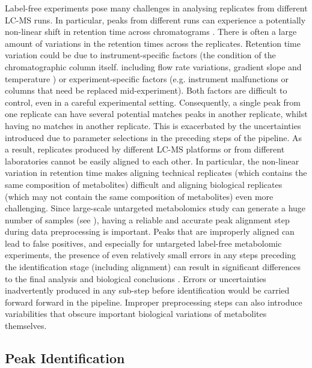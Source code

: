Label-free experiments pose many challenges in analysing replicates from different LC-MS runs. In particular, peaks from different runs can experience a potentially non-linear shift in retention time across chromatograms \cite{Podwojski2009}. There is often a large amount of variations in the retention times across the replicates. Retention time variation could be due to instrument-specific factors (the condition of the chromatographic column itself. including flow rate variations, gradient slope and temperature \cite{Christin2008}) or experiment-specific factors (e.g. instrument malfunctions or columns that need be replaced mid-experiment). Both factors are difficult to control, even in a careful experimental setting. Consequently, a single peak from one replicate can have several potential matches peaks in another replicate, whilst having no matches in another replicate. This is exacerbated by the uncertainties introduced due to parameter selections in the preceding steps of the pipeline. As a result, replicates produced by different LC-MS platforms or from different laboratories cannot be easily aligned to each other. In particular, the non-linear variation in retention time makes aligning technical replicates (which contains the same composition of metabolites) difficult and aligning biological replicates (which may not contain the same composition of metabolites) even more challenging. Since large-scale untargeted metabolomics study can generate a huge number of samples (see \cite{DeVos2007a,Creek2011}), having a reliable and accurate peak alignment step during data preprocessing is important. Peaks that are improperly aligned can lead to false positives, and especially for untargeted label-free metabolomic experiments, the presence of even relatively small errors in any steps preceding the identification stage (including alignment) can result in significant differences to the final analysis and biological conclusions \cite{Chawade2015}. Errors or uncertainties inadvertently produced in any sub-step before identification would be carried forward forward in the pipeline. Improper preprocessing steps can also introduce variabilities that obscure important biological variations of metabolites themselves. 

\subsection{Peak Identification\label{sub:identification}}

